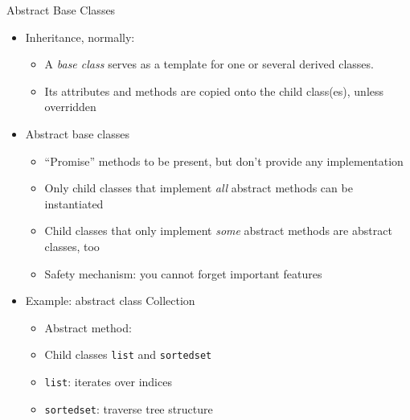 \begin{frame}{Abstract Base Classes}
%
\begin{itemize}
\item Inheritance, normally:
	\begin{itemize}
	\item A \emph{base class} serves as a template for one or several derived classes.
	\item Its attributes and methods are copied onto the child class(es), unless overridden
	\end{itemize}
	\pause
\item Abstract base classes
	\begin{itemize}
	\item \enquote{Promise} methods to be present, but don't provide any implementation
	\item Only child classes that implement \emph{all} abstract methods can be instantiated
	\item Child classes that only implement \emph{some} abstract methods are abstract classes, too
	\item[\Thus] Safety mechanism: you cannot forget important features
	\end{itemize}
	\pause
\item Example: abstract class Collection
	\begin{itemize}
	\item Abstract method: 
	\item Child classes \texttt{list} and \texttt{sortedset}
	\item \texttt{list}: iterates over indices
	\item \texttt{sortedset}: traverse tree structure
	\end{itemize}
\end{itemize}
%
\end{frame}


